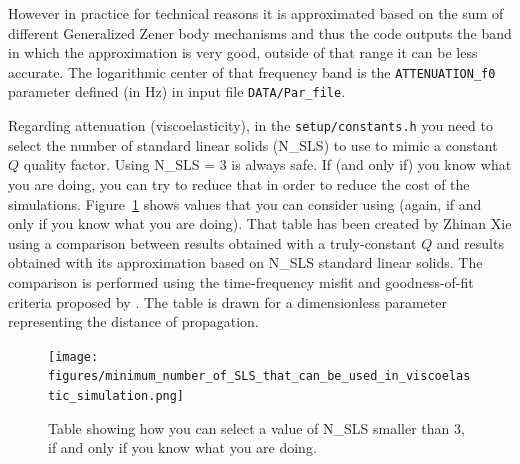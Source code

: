 \noindent
However in practice for technical reasons it is approximated based on the sum of different Generalized Zener body mechanisms
and thus the code outputs the band in which the approximation is very good, outside of that range it can be less accurate.
The logarithmic center of that frequency band is the \texttt{ATTENUATION\_f0} parameter defined (in Hz) in input file \texttt{DATA/Par\_file}. \newline

\noindent
Regarding attenuation (viscoelasticity), in the \texttt{setup/constants.h} you need to select the number of standard linear solids (N\_SLS) to use to mimic a constant $Q$ quality factor.
Using N\_SLS = 3 is always safe. If (and only if) you know what you are doing, you can try to reduce that in order to reduce the cost of the simulations.
Figure~\ref{fig:selectNSLS} shows values that you can consider using (again, if and only if you know what you are doing). That table has been created by Zhinan Xie using
a comparison between results obtained with a truly-constant $Q$ and results obtained with its approximation based on N\_SLS standard linear solids.
The comparison is performed using the time-frequency misfit and goodness-of-fit criteria proposed by \cite{Kristekova_2009}.
The table is drawn for a dimensionless parameter representing the distance of propagation.
\begin{figure}[htbp]
\centering
\texttt{[image: figures/minimum\_number\_of\_SLS\_that\_can\_be\_used\_in\_viscoelastic\_simulation.png]}
\caption{Table showing how you can select a value of N\_SLS smaller than 3, if and only if you know what you are doing.}
\label{fig:selectNSLS}
\end{figure}


